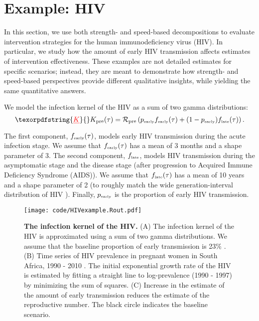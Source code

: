 \documentclass[12pt]{article}
\newcommand{\RR}{\ensuremath{{\mathcal R}}}
\newcommand{\Rx}[1]{\ensuremath{\RR_{\mathrm{#1}}}}
\newcommand{\Rpre}{\Rx{pre}}
\newcommand{\KK}{\ensuremath{{K}}}
\newcommand{\Kx}[1]{\ensuremath{\KK_{\mathrm{#1}}}}
\newcommand{\Kpre}{\Kx{pre}}
\newcommand{\tsub}[2]{#1_{{\textrm{\tiny #2}}}}
\newcommand{\figlab}[1]{\label{fig:#1}}
\providecommand{\DIFaddtex}[1]{{\protect\color{blue}\uwave{#1}}} %
\providecommand{\DIFdeltex}[1]{{\protect\color{red}\sout{#1}}}                      %
\providecommand{\DIFaddbegin}{} %
\providecommand{\DIFaddend}{} %
\providecommand{\DIFdelbegin}{} %
\providecommand{\DIFdelend}{} %
\providecommand{\DIFadd}[1]{\texorpdfstring{\DIFaddtex{#1}}{#1}} %
\providecommand{\DIFdel}[1]{\texorpdfstring{\DIFdeltex{#1}}{}} %
\newcommand{\DIFscaledelfig}{0.5}
\newlength{\DIFdelgraphicswidth} %
\newlength{\DIFdelgraphicsheight} %
\newcommand{\DIFaddincludegraphics}[2][]{{\color{blue}\fbox{\DIFOincludegraphics[#1]{#2}}}} %
\newcommand{\DIFdelincludegraphics}[2][]{%
\sbox{\DIFdelgraphicsbox}{\DIFOincludegraphics[#1]{#2}}%
\settoboxwidth{\DIFdelgraphicswidth}{\DIFdelgraphicsbox} %
\settoboxtotalheight{\DIFdelgraphicsheight}{\DIFdelgraphicsbox} %
\scalebox{\DIFscaledelfig}{%
\parbox[b]{\DIFdelgraphicswidth}{\usebox{\DIFdelgraphicsbox}\\[-\baselineskip] \rule{\DIFdelgraphicswidth}{0em}}\llap{\resizebox{\DIFdelgraphicswidth}{\DIFdelgraphicsheight}{%
\setlength{\unitlength}{\DIFdelgraphicswidth}%
\begin{picture}(1,1)%
\thicklines\linethickness{2pt} %
{\color[rgb]{1,0,0}\put(0,0){\framebox(1,1){}}}%
{\color[rgb]{1,0,0}\put(0,0){\line( 1,1){1}}}%
{\color[rgb]{1,0,0}\put(0,1){\line(1,-1){1}}}%
\end{picture}%
}\hspace*{3pt}}} %
} %
\DeclareRobustCommand{\DIFaddbegin}{\DIFOaddbegin \let\includegraphics\DIFaddincludegraphics} %
\DeclareRobustCommand{\DIFaddend}{\DIFOaddend \let\includegraphics\DIFOincludegraphics} %
\DeclareRobustCommand{\DIFdelbegin}{\DIFOdelbegin \let\includegraphics\DIFdelincludegraphics} %
\DeclareRobustCommand{\DIFdelend}{\DIFOaddend \let\includegraphics\DIFOincludegraphics} %
\begin{document}
\section{Example: HIV}

In this section, we use both strength- and speed-based decompositions to evaluate intervention strategies for the human immunodeficiency virus (HIV). 
In particular, we study how the amount of early HIV transmission affects estimates of intervention effectiveness. 
These examples are not detailed estimates for specific scenarios; 
instead, they are meant to demonstrate how strength- and speed-based perspectives provide different qualitative insights, while yielding the same quantitative answers.

We model the \DIFaddbegin \DIFadd{pre-intervention }\DIFaddend infection kernel of the HIV as a sum of two gamma distributions:
\begin{equation}
\DIFdelbegin \DIFdel{K}\DIFdelend \DIFaddbegin \Kpre\DIFaddend (\tau) = \DIFdelbegin %
\DIFdelend \DIFaddbegin \Rpre \DIFaddend \left(\tsub{p}{early} \tsub{f}{early}(\tau) + (1-\tsub{p}{early}) \tsub{f}{late}(\tau) \right).
\end{equation}
The first component, $\tsub{f}{early}(\tau)$, models early HIV transmission during the acute infection stage.
We assume that $\tsub{f}{early}(\tau)$ has a mean of 3 months \citep{hollingsworth2008hiv} and a shape parameter of 3.
The second component, $\tsub{f}{late}$, models HIV transmission during the asymptomatic stage and the disease stage (after progression to Acquired Immune Deficiency Syndrome (AIDS)).
We assume that $\tsub{f}{late}(\tau)$ has a mean of 10 years \citep{brookmeyer1989censoring, nishiura2019estimating} and a shape parameter of 2 (to roughly match the wide generation-interval distribution of HIV \citep{fraser2004factors}).
Finally, $\tsub{p}{early}$ is the proportion of early HIV transmission.

\begin{figure}[!th]
\texttt{[image: code/HIVexample.Rout.pdf]}
\caption{
\textbf{The infection kernel of the HIV.}
(A) The infection kernel of the HIV is approximated using a sum of two gamma distributions. We assume that the baseline proportion of early transmission is 23\% \citep{hayes2006amplified}.
(B) Time series of HIV prevalence in pregnant women in South Africa, 1990 - 2010 \citep{barron2013eliminating}. The initial exponential growth rate of the HIV is estimated by fitting a straight line to log-prevalence (1990 - 1997) by minimizing the sum of squares.
(C) Increase in the estimate of the amount of early transmission reduces the estimate of the reproductive number.
The black circle indicates the baseline scenario.
}
\figlab{example}
\end{figure}
\end{document}
